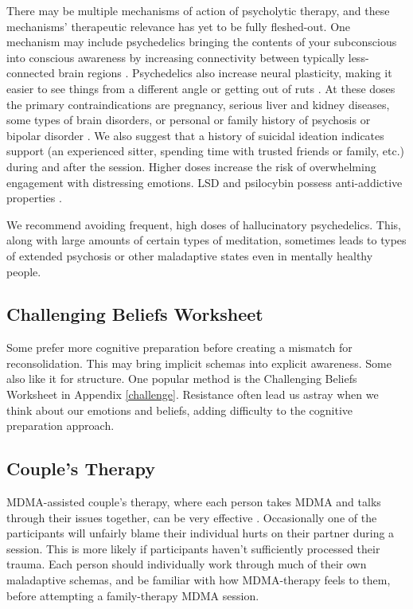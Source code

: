 \documentclass[12pt,letterpaper]{article}
\begin{document}

There may be multiple mechanisms of action of psycholytic therapy, and these mechanisms' therapeutic relevance has yet to be fully fleshed-out. One mechanism may include psychedelics bringing the contents of your subconscious into conscious awareness by increasing connectivity between typically less-connected brain regions \cite{linguiti2023functional}. Psychedelics also increase neural plasticity, making it easier to see things from a different angle or getting out of ruts \cite{nardou2023psychedelics}. At these doses the primary contraindications are pregnancy, serious liver and kidney diseases, some types of brain disorders, or personal or family history of psychosis or bipolar disorder \cite{schlagPsychedelicAdverseEffects,passiePsycholytic}. We also suggest that a history of suicidal ideation indicates support (an experienced sitter, spending time with trusted friends or family, etc.) during and after the session. Higher doses increase the risk of overwhelming engagement with distressing emotions. LSD and psilocybin possess anti-addictive properties \cite{principeAddiction}.

We recommend avoiding frequent, high doses of hallucinatory psychedelics. This, along with large amounts of certain types of meditation, sometimes leads to types of extended psychosis or other maladaptive states even in mentally healthy people. 
\subsection{Challenging Beliefs Worksheet}
\label{challengingBeliefsWorksheet}
Some prefer more cognitive preparation before creating a mismatch for reconsolidation.  This may bring implicit schemas into explicit awareness. Some also like it for structure. One popular method is the Challenging Beliefs Worksheet in Appendix \ref{challenge}. Resistance often lead us astray when we think about our emotions and beliefs, adding difficulty to the cognitive preparation approach.
\subsection{Couple's Therapy}
MDMA-assisted couple's therapy, where each person takes MDMA and talks through their issues together, can be very effective \cite{colbertEvenings}. Occasionally one of the participants will unfairly blame their individual hurts on their partner during a session. This is more likely if participants haven't sufficiently processed their trauma. Each person should individually work through much of their own maladaptive schemas, and be familiar with how MDMA-therapy feels to them, before attempting a family-therapy MDMA session.
\end{document}
